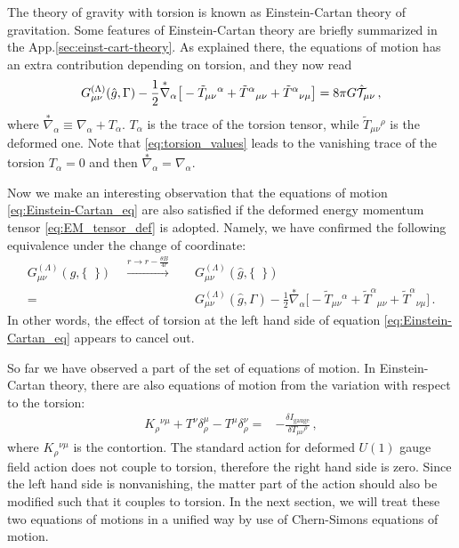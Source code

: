 \documentclass[11pt]{article}
\newcommand{\nn}{\nonumber}
\numberwithin{equation}{section}
\begin{document}
The theory of gravity with torsion is known as Einstein-Cartan theory of gravitation.
Some features of Einstein-Cartan theory are briefly summarized in the App.\ref{sec:einst-cart-theory}.
As explained there, the equations of motion has an extra contribution depending on torsion,
and they now read
\begin{align}
  G_{\mu\nu}^{(\Lambda)}(\hat{g},\Gamma) -\frac{1}{2}  \overset{*}{\nabla}_\alpha
\big[- \tilde{T}_{\mu\nu}{}^\alpha+\tilde{T}^\alpha{}_{\mu\nu}+\tilde{T}^\alpha{}_{\nu\mu} \big]
= 8\pi G \hat{\cal T}_{\mu\nu} \,,
\label{eq:Einstein-Cartan_eq}
\end{align}
where $\overset{*}{\nabla}_\alpha\equiv \nabla_\alpha + T_\alpha$.  
$T_\alpha$ is the trace of the torsion tensor, while 
$\tilde{T}_{\mu\nu}{}^\rho$ is the deformed one.
Note that \eqref{eq:torsion_values} leads to the vanishing trace of the torsion $T_\alpha=0$
and then $\overset{*}{\nabla}_\alpha= \nabla_\alpha$.

Now we make an interesting observation that the equations of motion \eqref{eq:Einstein-Cartan_eq} are
also satisfied if the deformed energy momentum tensor \eqref{eq:EM_tensor_def} is adopted.
Namely, we have confirmed the following equivalence under the change of coordinate:
\begin{align}
  G_{\mu\nu}^{(\Lambda)}(g,\{ \phantom{a}\})
\quad
\xrightarrow{r\rightarrow r-\frac{\theta B}{4r}}
\quad
&
G_{\mu\nu}^{(\Lambda)}(\hat{g},\{ \phantom{a}\}) 
\nn\\=&
  G_{\mu\nu}^{(\Lambda)}(\hat{g},\Gamma) -\frac{1}{2}  \overset{*}{\nabla}_\alpha
\big[- \tilde{T}_{\mu\nu}{}^\alpha+\tilde{T}^\alpha{}_{\mu\nu}+\tilde{T}^\alpha{}_{\nu\mu} \big]
\,.
\end{align}
In other words, the effect of torsion at the left hand side of equation \eqref{eq:Einstein-Cartan_eq} appears to cancel out.

So far we have observed a part of the set of equations of motion.
In Einstein-Cartan theory, there are also equations of motion from the variation
with respect to the torsion:
\begin{align}
  K_\rho{}^{\nu\mu}+T^\nu\delta^\mu_\rho-T^\mu\delta^\nu_\rho
=& -\frac{\delta I_\text{gauge}}{\delta T_{\mu\nu}{}^\rho} \,,
\end{align}
where $K_\rho{}^{\nu\mu}$ is the contortion.
The standard action for deformed $U(1)$ gauge field action does not couple to torsion, therefore the right hand side is zero.
Since the left hand side is nonvanishing, the matter part of the
action should also be modified such that it couples to torsion.
In the next section, we will treat these two equations of motions in a unified way by use of Chern-Simons equations of
motion.
\end{document}
